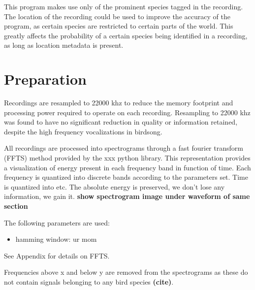 This program makes use only of the prominent species tagged in the recording.
The location of the recording could be used to improve the accuracy of the
program, as certain species are restricted to certain parts of the world.
This greatly affects the probability of a certain species being identified in
a recording, as long as location metadata is present.

\section{Preparation}
Recordings are resampled to 22000 khz to reduce the memory footprint and
processing power required to operate on each recording.
Resampling to 22000 khz was found to have no significant reduction in quality
or information retained, despite the high frequency vocalizations in birdsong.

All recordings are processed into spectrograms through a fast fourier transform
(FFTS) method provided by the xxx python library.
This representation provides a visualization of energy present in each frequency
band in function of time.
Each frequency is quantized into discrete bands according to the parameters set.
Time is quantized into etc.
The absolute energy is preserved, we don't lose any information, we gain it.
\textbf{show spectrogram image under waveform of same section}

The following parameters are used:
\begin{itemize}
  \item hamming window: ur mom
\end{itemize}

See Appendix for details on FFTS.

Frequencies above x and below y are removed from the spectrograms as these do
not contain signals belonging to any bird species \textbf{(cite)}.
